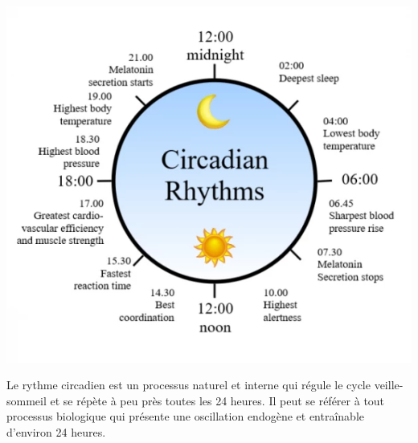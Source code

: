 



\includegraphics[scale=1.00]{media/circadien.png}

Le rythme circadien est un processus naturel et interne qui régule le cycle
veille-sommeil et se répète à peu près toutes les 24 heures.
Il peut se référer à tout processus biologique qui présente une oscillation
endogène et entraînable d'environ 24 heures.

